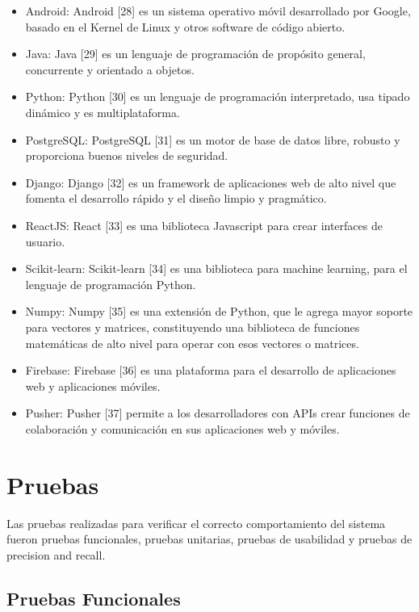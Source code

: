 \documentclass[12pt,letterpaper,openany]{book}
\begin{document}
\begin{itemize}
    \item Android: Android [28] es un sistema operativo móvil desarrollado por Google, basado en el Kernel de Linux y otros software de código abierto.
    \item Java: Java [29] es un lenguaje de programación de propósito general, concurrente y orientado a objetos.
    \item Python: Python [30] es un lenguaje de programación interpretado, usa tipado dinámico y es multiplataforma.
    \item PostgreSQL: PostgreSQL [31] es un motor de base de datos libre, robusto y proporciona buenos niveles de seguridad.
    \item Django: Django [32] es un framework de aplicaciones web de alto nivel que fomenta el desarrollo rápido y el diseño limpio y pragmático.
    \item ReactJS: React [33] es una biblioteca Javascript para crear interfaces de usuario.
    \item Scikit-learn: Scikit-learn [34] es una biblioteca para machine learning, para el lenguaje de programación Python.
    \item Numpy: Numpy [35] es una extensión de Python, que le agrega mayor soporte para vectores y matrices, constituyendo una biblioteca de funciones matemáticas de alto nivel para operar con esos vectores o matrices.
    \item Firebase: Firebase [36] es una plataforma para el desarrollo de aplicaciones web y aplicaciones móviles.
    \item Pusher: Pusher [37] permite a los desarrolladores con APIs crear funciones de colaboración y comunicación en sus aplicaciones web y móviles.
\end{itemize}

\section{Pruebas}
Las pruebas realizadas para verificar el correcto comportamiento del sistema fueron pruebas funcionales, pruebas unitarias, pruebas de usabilidad y pruebas de precision and recall.

\subsection{Pruebas Funcionales}
\end{document}
